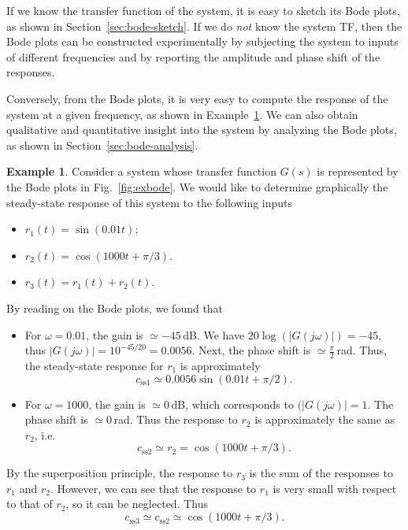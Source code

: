 \documentclass[a4paper,11pt]{report}
\theoremstyle{definition}
\newtheorem{mdexample}{Example}
\newenvironment{example}%
  {\vspace{0.1cm}\begin{mdframed}[backgroundcolor=lightgray]\begin{mdexample}}%
  {\end{mdexample}\end{mdframed}\vspace{0.1cm}}
\begin{document}
If we know the transfer function of the system, it is easy to sketch
its Bode plots, as shown in Section~\ref{sec:bode-sketch}. If we do
\emph{not} know the system TF, then the Bode plots can be constructed
experimentally by subjecting the system to inputs of different
frequencies and by reporting the amplitude and phase shift of the
responses.

Conversely, from the Bode plots, it is very easy to compute the
response of the system at a given frequency, as shown in
Example~\ref{ex:bode}. We can also obtain qualitative and quantitative
insight into the system by analyzing the Bode plots, as shown in
Section~\ref{sec:bode-analysis}.

\begin{example}
  \label{ex:bode}
  Consider a system whose transfer function $G(s)$ is represented by
  the Bode plots in Fig.~\ref{fig:exbode}. We would like to determine
  graphically the steady-state response of this system to the
  following inputs
  \begin{itemize}
  \item $r_1(t) = \sin(0.01t)$;
  \item $r_2(t) = \cos(1000t+\pi/3)$.
  \item $r_3(t) = r_1(t) + r_2(t)$.
  \end{itemize}
  
  By reading on the Bode plots, we found that
  \begin{itemize}
  \item For $\omega=0.01$, the gain is  $\simeq-45$\,dB. We have
    $20\log(|G(j\omega)|) = -45$, thus $|G(j\omega)|=10^{-45/20} =
    0.0056$. Next, the phase shift is $\simeq\frac{\pi}{2}$\,rad. Thus,
    the steady-state response for $r_1$ is approximately
    \[
    c_\mathrm{ss1} \simeq 0.0056\sin(0.01t+\pi/2).
    \]
  \item For $\omega=1000$, the gain is $\simeq0$\,dB, which
    corresponds to $(|G(j\omega)|=1$. The phase shift is
    $\simeq0$\,rad. Thus the response to $r_2$ is approximately the
    same as $r_2$, i.e.
    \[
    c_\mathrm{ss2} \simeq r_2=\cos(1000t+\pi/3).
    \]
  \end{itemize}

  By the superposition principle, the response to $r_3$ is the sum of
  the responses to $r_1$ and $r_2$. However, we can see that the
  response to $r_1$ is very small with respect to that of $r_2$, so it
  can be neglected. Thus
  \[
  c_\mathrm{ss3} \simeq c_\mathrm{ss2} \simeq \cos(1000t+\pi/3).
  \]
  

\end{example}
\end{document}
